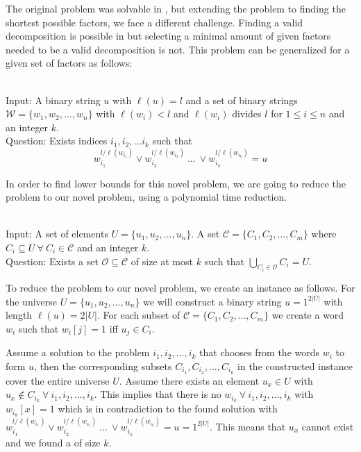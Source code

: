 The original problem was solvable in \LogSpace, but extending the problem to finding the shortest possible factors, we face a different challenge.
Finding a valid decomposition is possible in \LogSpace but selecting a minimal amount of given factors needed to be a valid decomposition is not.
This problem can be generalized for a given set of factors as follows:

\begin{defn}{\ \\}
	Input: A binary string $u$ with $\ell(u)= l$ and a set of binary strings $\mathcal{W} = \{w_1, w_2, \dots, w_n\}$ with $\ell(w_i) < l$ and $\ell(w_i)$ divides $l$ for $1 \leq i \leq n$ and an integer $k$.\\
	Question: Exists indices $i_1, i_2, \dots i_k$ such that
	$$w_{i_1}^{l / \ell(w_{i_1})} \lor w_{i_2}^{l / \ell(w_{i_2})} ~\dots~ \lor w_{i_k}^{l / \ell(w_{i_k})} = u $$
\end{defn}

In order to find lower bounds for this novel problem, we are going to reduce the {} problem to our novel {} problem, using a polynomial time reduction.

\begin{defn}{\ \\}
	Input: A set of elements $U = \{u_1, u_2, \dots , u_n\}$. A set $\mathcal{C} = \{C_1, C_2, \dots , C_m\}$ where $C_i \subseteq U ~\forall~ C_i \in \mathcal{C}$ and an integer $k$.\\
	Question: Exists a set $\mathcal{O} \subseteq \mathcal{C}$ of size  at most $k$ such that $\underset{C_i \in \mathcal{O}}{\bigcup}C_i = U$.
\end{defn}
To reduce the {} problem to our novel problem, we create an instance as follows.
For the universe $U = \{u_1, u_2, \dots, u_n\}$ we will construct a binary string $u= 1^{2|U|}$ with length $\ell(u) = 2|U|$. For each subset of $\mathcal{C} = \{C_1, C_2, \dots, C_m\}$ we create a word $w_i$ such that $w_i[j] = 1$ iff $u_j \in C_i$. 

Assume a solution to the {} problem $i_1, i_2, \dots, i_k$ that chooses from the words $w_i$ to form $u$, then the corresponding subsets $C_{i_1}, C_{i_2}, \dots, C_{i_k}$ in the constructed {} instance cover the entire universe $U$.
Assume there exists an element $u_x \in U$ with $u_x \not \in C_{i_k} ~\forall~ i_1, i_2, \dots, i_k$.
This implies that there is no $w_{i_k} ~\forall~ i_1, i_2, \dots, i_k$ with $w_{i_k}[x]=1$ which is in contradiction to the found solution with $w_{i_1}^{l / \ell(w_{i_1})} \lor w_{i_2}^{l / \ell(w_{i_2})} ~\dots~ \lor w_{i_k}^{l / \ell(w_{i_k})} = u = 1^{2|U|}$.
This means that $u_x$ cannot exist and we found a {} of size $k$.


